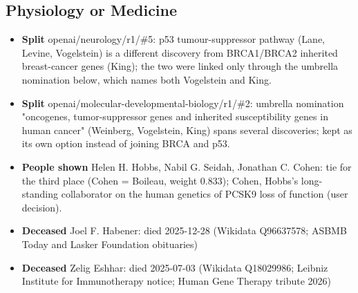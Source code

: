 \documentclass[11pt]{article}
\begin{document}
\subsection*{Physiology or Medicine}
\begin{itemize}[leftmargin=*]
\item \textbf{Split} openai/neurology/r1/\#5: p53 tumour-suppressor pathway (Lane, Levine, Vogelstein) is a different discovery from BRCA1/BRCA2 inherited breast-cancer genes (King); the two were linked only through the umbrella nomination below, which names both Vogelstein and King.
\item \textbf{Split} openai/molecular-developmental-biology/r1/\#2: umbrella nomination "oncogenes, tumor-suppressor genes and inherited susceptibility genes in human cancer" (Weinberg, Vogelstein, King) spans several discoveries; kept as its own option instead of joining BRCA and p53.
\item \textbf{People shown} Helen H. Hobbs, Nabil G. Seidah, Jonathan C. Cohen: tie for the third place (Cohen = Boileau, weight 0.833); Cohen, Hobbs's long-standing collaborator on the human genetics of PCSK9 loss of function (user decision).
\item \textbf{Deceased} Joel F. Habener: died 2025-12-28 (Wikidata Q96637578; ASBMB Today and Lasker Foundation obituaries)
\item \textbf{Deceased} Zelig Eshhar: died 2025-07-03 (Wikidata Q18029986; Leibniz Institute for Immunotherapy notice; Human Gene Therapy tribute 2026)
\end{itemize}
\end{document}
